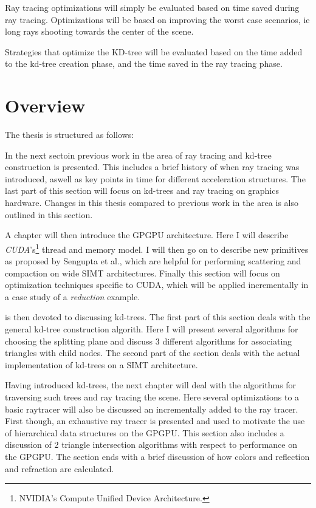 
Ray tracing optimizations will simply be evaluated based on time saved
during ray tracing. Optimizations will be based on improving the
worst case scenarios, ie long rays shooting towards the center of
the scene.

Strategies that optimize the KD-tree will be evaluated based on the
time added to the kd-tree creation phase, and the time saved in the
ray tracing phase.

\section{Overview}

The thesis is structured as follows:


In the next sectoin previous work in the area of ray tracing and
kd-tree construction is presented. This includes a brief history of
when ray tracing was introduced, aswell as key points in time for
different acceleration structures. The last part of this section will
focus on kd-trees and ray tracing on graphics hardware. Changes in
this thesis compared to previous work in the area is also outlined in
this section.


A chapter will then introduce the GPGPU architecture. Here I will
describe \textit{CUDA}'s\footnote{NVIDIA's Compute Unified Device
  Architecture.} thread and memory model. I will then go on to
describe new primitives as proposed by Sengupta et
al., which are helpful for performing
scattering and compaction on wide SIMT architectures. Finally this
section will focus on optimization techniques specific to CUDA, which
will be applied incrementally in a case study of a \textit{reduction}
example.


 is then devoted to discussing kd-trees. The
first part of this section deals with the general kd-tree construction
algorith. Here I will present several algorithms for choosing the
splitting plane and discuss 3 different algorithms for associating
triangles with child nodes. The second part of the section deals with
the actual implementation of kd-trees on a SIMT architecture.


Having introduced kd-trees, the next chapter will deal with the
algorithms for traversing such trees and ray tracing the scene. Here
several optimizations to a basic raytracer will also be discussed an
incrementally added to the ray tracer. First though, an exhaustive ray
tracer is presented and used to motivate the use of hierarchical data
structures on the GPGPU. This section also includes a discussion of 2
triangle intersection algorithms with respect to performance on the
GPGPU. The section ends with a brief discussion of how colors and
reflection and refraction are calculated.



